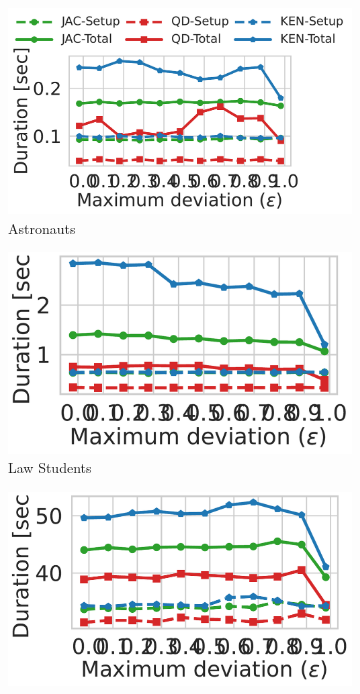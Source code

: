 \begin{figure}[t]
    \begin{subfigure}{.35\textwidth}
      \centering
      \includegraphics[width=.87\linewidth]{figures/astr_eps.pdf}
      \hspace{-0.54cm}
      \caption{Astronauts}
      \label{fig:r9}
    \end{subfigure}
    \begin{subfigure}{.35\textwidth}
      \centering
      \includegraphics[width=.75\linewidth]{figures/law_eps.pdf}
      \caption{Law Students}
      \label{fig:r10}
    \end{subfigure}
    \begin{subfigure}{.35\textwidth}
      \centering
      \includegraphics[width=.75\linewidth]{figures/meps_eps.pdf}

\end{subfigure}
\end{figure}
